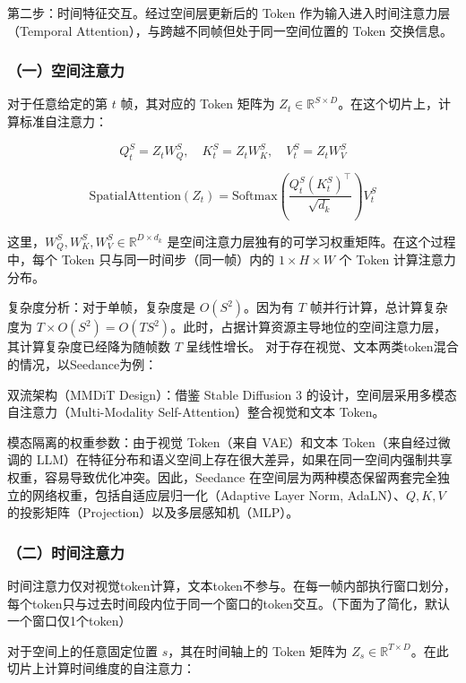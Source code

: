 第二步：时间特征交互。经过空间层更新后的 Token 作为输入进入时间注意力层（Temporal Attention），与跨越不同帧但处于同一空间位置的 Token 交换信息。

\hypertarget{ux4e00ux7a7aux95f4ux6ce8ux610fux529b}{%
\subsubsection{（一）空间注意力}\label{ux4e00ux7a7aux95f4ux6ce8ux610fux529b}}

对于任意给定的第 \(t\) 帧，其对应的 Token 矩阵为 \(Z_t\in\mathbb{R}^{S\times D}\)。在这个切片上，计算标准自注意力：

\[
Q_t^S=Z_tW_Q^S,\quad K_t^S=Z_tW_K^S,\quad V_t^S=Z_tW_V^S
\]

\[
\mathrm{SpatialAttention}(Z_t)=\mathrm{Softmax}\left(\frac{Q_t^S(K_t^S)^\top}{\sqrt{d_k}}\right)V_t^S
\]

这里，\(W_Q^S,W_K^S,W_V^S\in\mathbb{R}^{D\times d_k}\) 是空间注意力层独有的可学习权重矩阵。在这个过程中，每个 Token 只与同一时间步（同一帧）内的 \(1\times H\times W\) 个 Token 计算注意力分布。

复杂度分析：对于单帧，复杂度是 \(O(S^2)\)。因为有 \(T\) 帧并行计算，总计算复杂度为 \(T\times O(S^2)=O(TS^2)\)。此时，占据计算资源主导地位的空间注意力层，其计算复杂度已经降为随帧数 \(T\) 呈线性增长。
对于存在视觉、文本两类token混合的情况，以Seedance为例：

双流架构（MMDiT Design）：借鉴 Stable Diffusion 3 的设计，空间层采用多模态自注意力（Multi-Modality Self-Attention）整合视觉和文本 Token。

模态隔离的权重参数：由于视觉 Token（来自 VAE）和文本 Token（来自经过微调的 LLM）在特征分布和语义空间上存在很大差异，如果在同一空间内强制共享权重，容易导致优化冲突。因此，Seedance 在空间层为两种模态保留两套完全独立的网络权重，包括自适应层归一化（Adaptive Layer Norm, AdaLN）、\(Q,K,V\) 的投影矩阵（Projection）以及多层感知机（MLP）。

\hypertarget{ux4e8cux65f6ux95f4ux6ce8ux610fux529b}{%
\subsubsection{（二）时间注意力}\label{ux4e8cux65f6ux95f4ux6ce8ux610fux529b}}

时间注意力仅对视觉token计算，文本token不参与。在每一帧内部执行窗口划分，每个token只与过去时间段内位于同一个窗口的token交互。（下面为了简化，默认一个窗口仅1个token）

对于空间上的任意固定位置 \(s\)，其在时间轴上的 Token 矩阵为 \(Z_s\in\mathbb{R}^{T\times D}\)。在此切片上计算时间维度的自注意力：

